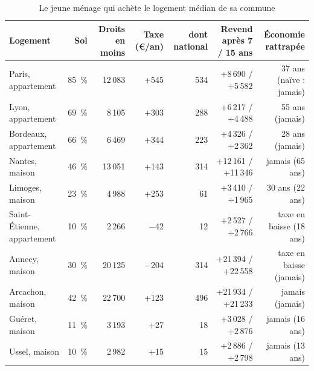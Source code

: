 \begin{table}[!htbp]\centering\scriptsize
\caption{Le jeune ménage qui achète le logement médian de sa commune}\label{tab:fon_primo}
\setlength{\tabcolsep}{4pt}
\begin{tabularx}{\linewidth}{@{}>{\raggedright\arraybackslash}X rrrrrr@{}}
\toprule
Logement & Sol & Droits en moins & Taxe (€/an) & dont national & Revend après 7 / 15 ans & Économie rattrapée \\
\midrule
Paris, appartement & 85~\% & 12\,083 & +545 & 534 & +8\,690 / +5\,582 & 37 ans (naïve : jamais) \\
Lyon, appartement & 69~\% & 8\,105 & +303 & 288 & +6\,217 / +4\,488 & 55 ans (jamais) \\
Bordeaux, appartement & 66~\% & 6\,469 & +344 & 223 & +4\,326 / +2\,362 & 28 ans (jamais) \\
Nantes, maison & 46~\% & 13\,051 & +143 & 314 & +12\,161 / +11\,346 & jamais (65 ans) \\
Limoges, maison & 23~\% & 4\,988 & +253 & 61 & +3\,410 / +1\,965 & 30 ans (22 ans) \\
Saint-Étienne, appartement & 10~\% & 2\,266 & $-$42 & 12 & +2\,527 / +2\,766 & taxe en baisse (18 ans) \\
Annecy, maison & 30~\% & 20\,125 & $-$204 & 314 & +21\,394 / +22\,558 & taxe en baisse (jamais) \\
Arcachon, maison & 42~\% & 22\,700 & +123 & 496 & +21\,934 / +21\,233 & jamais (jamais) \\
Guéret, maison & 11~\% & 3\,193 & +27 & 18 & +3\,028 / +2\,876 & jamais (16 ans) \\
Ussel, maison & 10~\% & 2\,982 & +15 & 15 & +2\,886 / +2\,798 & jamais (13 ans) \\
\bottomrule
\end{tabularx}
\par\vspace{2pt}{\raggedright\scriptsize En euros ; taxe de 2025, droits au taux permanent, logement médian aux prix de
2023-2024, sans effet sur les prix. Revend : économie de droits moins la valeur actuelle (3~\%) de la hausse de taxe
payée pendant la détention. Économie rattrapée : durée au bout de laquelle la hausse actualisée égale l'économie
(« jamais » si la hausse perpétuelle actualisée reste inférieure) ; entre parenthèses, la réforme naïve. Une famille
nantaise qui passe d'un appartement à une maison de 450\,000~€ paie 13\,050~€ de droits au lieu de 26\,100~€.\par}
\end{table}

